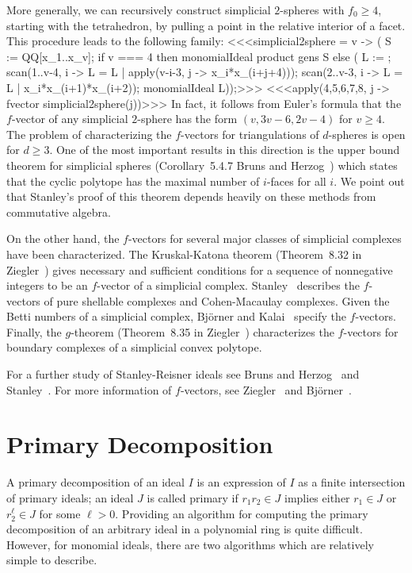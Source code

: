 More generally, we can recursively construct simplicial $2$-spheres
with $f_{0} \geq 4$, starting with the tetrahedron, by pulling a point
in the relative interior of a facet.  This procedure leads to the
following family:
<<<simplicial2sphere = v -> ( 
     S := QQ[x_1..x_v]; 
     if v === 4 then monomialIdeal product gens S 
     else ( 
          L := {};
          scan(1..v-4, i -> L = L | apply(v-i-3, 
                    j -> x_i*x_(i+j+4))); 
          scan(2..v-3, i -> L = L | {x_i*x_(i+1)*x_(i+2)}); 
          monomialIdeal L));>>>
<<<apply({4,5,6,7,8}, j -> fvector simplicial2sphere(j))>>>
In fact, it follows from Euler's formula that the $f$-vector of any
simplicial $2$-sphere has the form $(v, 3v-6, 2v-4)$ for $v \geq 4$.
The problem of characterizing the $f$-vectors for triangulations of
$d$-spheres is open for $d \geq 3$.  One of the most important results
in this direction is the upper bound theorem for simplicial spheres
(Corollary~5.4.7 Bruns and Herzog~\cite{MR95h:13020}) which states
that the cyclic polytope has the maximal number of $i$-faces for all
$i$.  We point out that Stanley's proof of this theorem depends
heavily on these methods from commutative algebra.

On the other hand, the $f$-vectors for several major classes of
simplicial complexes have been characterized.  The Kruskal-Katona
theorem (Theorem~8.32 in Ziegler~\cite{MR96a:52011}) gives necessary
and sufficient conditions for a sequence of nonnegative integers to be
an $f$-vector of a simplicial complex.  Stanley~\cite{MR98h:05001}
describes the $f$-vectors of pure shellable complexes and
Cohen-Macaulay complexes.  Given the Betti numbers of a simplicial
complex, Bj\"{o}rner and Kalai~\cite{MR89m:52009} specify the
$f$-vectors.  Finally, the $g$-theorem (Theorem~8.35 in
Ziegler~\cite{MR96a:52011}) characterizes the $f$-vectors for boundary
complexes of a simplicial convex polytope.

For a further study of Stanley-Reisner ideals see Bruns and
Herzog~\cite{MR95h:13020} and Stanley~\cite{MR98h:05001}.  For more
information of $f$-vectors, see Ziegler~\cite{MR96a:52011} and
Bj\"{o}rner~\cite{MR96h:05213}.

\section{Primary Decomposition}

A primary decomposition of an ideal $I$
is an expression of $I$ as a finite intersection of primary ideals; an
ideal $J$ is called primary if $r_{1}r_{2} \in J$
implies either $r_{1} \in J$ or $r_{2}^{\ell} \in J$ for some $\ell >
0$.  Providing an algorithm for computing the primary decomposition of
an arbitrary ideal in a polynomial ring is quite difficult.  However,
for monomial ideals, there are two algorithms which are relatively
simple to describe.

